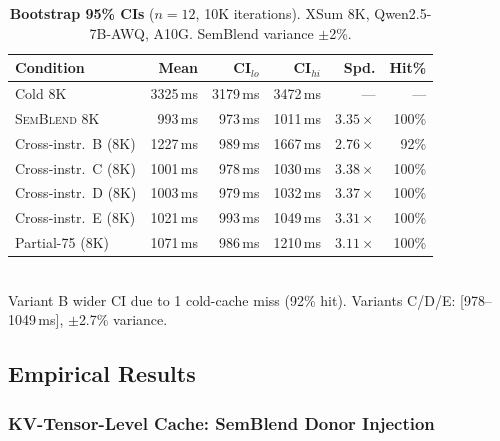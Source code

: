 \documentclass[10pt,twocolumn]{article}
\newcommand{\semblend}{\textsc{SemBlend}\xspace}
\begin{document}
\begin{table}[t]
\centering
\caption{\textbf{Bootstrap 95\% CIs} ($n{=}12$, 10K iterations).
XSum 8K, Qwen2.5-7B-AWQ, A10G. SemBlend variance ${\pm}$2\%.}
\label{tab:bootstrap-ci}
\scriptsize
\setlength{\tabcolsep}{2.5pt}
\begin{tabular}{@{}lrrrrr@{}}
\toprule
\textbf{Condition} & \textbf{Mean} & \textbf{CI$_{lo}$} & \textbf{CI$_{hi}$}
  & \textbf{Spd.} & \textbf{Hit\%} \\
\midrule
Cold 8K                & 3325\,ms & 3179\,ms & 3472\,ms & ---          & --- \\
\semblend 8K           &  993\,ms &  973\,ms & 1011\,ms & $3.35\times$ & 100\% \\
\midrule
Cross-instr.\ B (8K)   & 1227\,ms &  989\,ms & 1667\,ms & $2.76\times$ & 92\% \\
Cross-instr.\ C (8K)   & 1001\,ms &  978\,ms & 1030\,ms & $3.38\times$ & 100\% \\
Cross-instr.\ D (8K)   & 1003\,ms &  979\,ms & 1032\,ms & $3.37\times$ & 100\% \\
Cross-instr.\ E (8K)   & 1021\,ms &  993\,ms & 1049\,ms & $3.31\times$ & 100\% \\
\midrule
Partial-75 (8K)        & 1071\,ms &  986\,ms & 1210\,ms & $3.11\times$ & 100\% \\
\bottomrule
\end{tabular}\\[2pt]
{\scriptsize Variant B wider CI due to 1 cold-cache miss (92\% hit).
Variants C/D/E: [978--1049\,ms], $\pm$2.7\% variance.}
\end{table}

\subsection{Empirical Results}
\label{sec:empirical}

\subsubsection{KV-Tensor-Level Cache: SemBlend Donor Injection}
\label{sec:kv-results}
\end{document}
